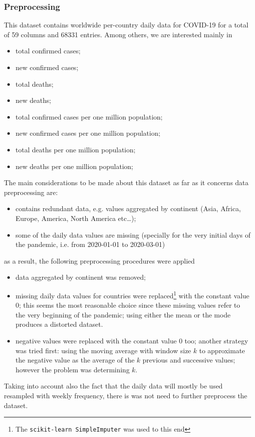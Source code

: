 \documentclass[11pt,a4paper]{article}
\begin{document}
\subsubsection{Preprocessing}
This dataset contains worldwide per-country daily data for COVID-19 for a total
of 59 columns and 68331 entries. Among others, we are interested mainly in
\begin{itemize}
    \item total confirmed cases;
    \item new confirmed cases;
    \item total deaths;
    \item new deaths;
    \item total confirmed cases per one million population;
    \item new confirmed cases per one million population;
    \item total deaths per one million population;
    \item new deaths per one million population;
\end{itemize}
The main considerations to be made about this dataset as far as it concerns data
preprocessing are:
\begin{itemize}
    \item contains redundant data, e.g. values aggregated by continent (Asia,
    Africa, Europe, America, North America etc\dots);
    \item some of the daily data values are missing (specially for the very
    initial days of the pandemic, i.e. from 2020-01-01 to 2020-03-01)
\end{itemize}
as a result, the following preprocessing procedures were applied
\begin{itemize}
    \item data aggregated by continent was removed;
    \item missing daily data values for countries were replaced\footnote{The
    \texttt{scikit-learn SimpleImputer} was used to this end} with the constant
    value $0$; this seems the most reasonable choice since these missing values
    refer to the very beginning of the pandemic; using either the mean or the
    mode produces a distorted dataset.
    \item negative values were replaced with the constant value $0$ too; another
    strategy was tried first: using the moving average with window size $k$ to
    approximate the negative value as the average of the $k$ previous and
    successive values; however the problem was determining $k$.
\end{itemize}
Taking into account also the fact that the daily data will mostly be used
resampled with weekly frequency, there is was not need to further preprocess the
dataset.
\end{document}
